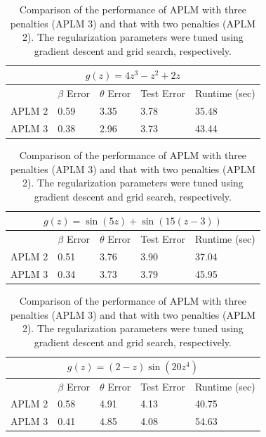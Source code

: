 \documentclass[10pt,letterpaper]{article}
\begin{document}
\begin{table}
\begin{center}
\begin{tabular}{| l | l | l | l | l | }
\hline
\multicolumn{5}{|c|}{$g(z) = 4z^3 - z^2 + 2z$}\\
\hline
 & $\beta$ Error & $\theta$ Error & Test Error & Runtime (sec) \\
\hline
APLM 2 & 0.59 & 3.35 & 3.78 & 35.48 \\
\hline
APLM 3 & 0.38 & 2.96 & 3.73 & 43.44 \\
\hline
\end{tabular}

\begin{tabular}{| l | l | l | l | l | }
\hline
\multicolumn{5}{|c|}{$g(z) = \sin(5z) + \sin(15(z - 3))$}\\
\hline
 & $\beta$ Error & $\theta$ Error & Test Error & Runtime (sec) \\
\hline
APLM 2 & 0.51 & 3.76 & 3.90 & 37.04 \\
\hline
APLM 3 & 0.34 & 3.73 & 3.79 & 45.95 \\
\hline
\end{tabular}

\begin{tabular}{| l | l | l | l | l | }
\hline
\multicolumn{5}{|c|}{$g(z) = (2-z)\sin(20z^4)$}\\
\hline
 & $\beta$ Error & $\theta$ Error & Test Error & Runtime (sec) \\
\hline
APLM 2 & 0.58 & 4.91 & 4.13 & 40.75 \\
\hline
APLM 3 & 0.41 & 4.85 & 4.08 & 54.63 \\
\hline
\end{tabular}
\end{center}
\caption {Comparison of the performance of APLM with three penalties (APLM 3) and that with two penalties (APLM 2). The regularization parameters were tuned using gradient descent and grid search, respectively.}
\label{ref:aplm}
\end{table}

\end{document}
